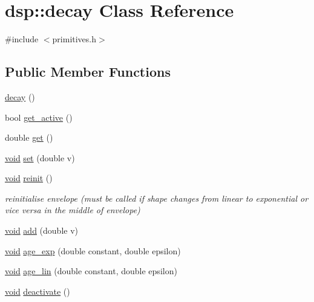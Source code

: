 \hypertarget{classdsp_1_1decay}{}\section{dsp\+:\+:decay Class Reference}
\label{classdsp_1_1decay}


{\ttfamily \#include $<$primitives.\+h$>$}

\subsection*{Public Member Functions}
\begin{DoxyCompactItemize}
\item 
\hyperlink{classdsp_1_1decay_aeffae2bc061f4917e195befd61ff5748}{decay} ()
\item 
bool \hyperlink{classdsp_1_1decay_a8a028f316ab26c51c584b47a70b4ab41}{get\+\_\+active} ()
\item 
double \hyperlink{classdsp_1_1decay_a98445c5ea83b0a2ca618aadafcb008cf}{get} ()
\item 
\hyperlink{tk_8h_aba408b7cd755a96426e004c015f5de8e}{void} \hyperlink{classdsp_1_1decay_a9881a9de2882dfa0c0b4c30321d3f1ec}{set} (double v)
\item 
\hyperlink{tk_8h_aba408b7cd755a96426e004c015f5de8e}{void} \hyperlink{classdsp_1_1decay_ab6ef69c8dc23b9d836726a9abb73dda4}{reinit} ()
\begin{DoxyCompactList}\small\item\em reinitialise envelope (must be called if shape changes from linear to exponential or vice versa in the middle of envelope) \end{DoxyCompactList}\item 
\hyperlink{tk_8h_aba408b7cd755a96426e004c015f5de8e}{void} \hyperlink{classdsp_1_1decay_afcf3bd1da490629f9238b760e311c442}{add} (double v)
\item 
\hyperlink{tk_8h_aba408b7cd755a96426e004c015f5de8e}{void} \hyperlink{classdsp_1_1decay_a40f4ee2f3c739a9793cdc93378d7cf9e}{age\+\_\+exp} (double constant, double epsilon)
\item 
\hyperlink{tk_8h_aba408b7cd755a96426e004c015f5de8e}{void} \hyperlink{classdsp_1_1decay_a82c3af3d66dfdcc0a2fa3555dd1c7bfd}{age\+\_\+lin} (double constant, double epsilon)
\item 
\hyperlink{tk_8h_aba408b7cd755a96426e004c015f5de8e}{void} \hyperlink{classdsp_1_1decay_a5d7e77ead25f75a32d8cc759a827bb80}{deactivate} ()
\end{DoxyCompactItemize}
